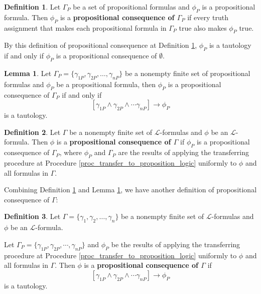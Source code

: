 \documentclass[11pt,letterpaper]{book}
\theoremstyle{definition}
\newtheorem{definition}{Definition}[section]
\newtheorem{lemma}{Lemma}[section]
\begin{document}
\begin{definition}\label{def:PC_proposition_formula}
Let $\Gamma_P$ be a set of propositional formulas and $\phi_P$ is a
propositional formula. Then $\phi_P$ is a \textbf{propositional
consequence of $\Gamma_P$} if every truth assignment that makes each
propositional formula in $\Gamma_P$ true also makes $\phi_P$ true.
\end{definition}


By this definition of propositional consequence at Definition
\ref{def:PC_proposition_formula}, $\phi_P$ is a tautology if and only if
$\phi_P$ is a propositional
consequence of $\emptyset$.


\begin{lemma}\label{lemma:PC_tautology}
Let $\Gamma_P = \{ \gamma_{1P}, \gamma_{2P}, \ldots, \gamma_{nP} \}$ be
a nonempty finite set of propositional formulas and $\phi_P$ be a
propositional formula, then $\phi_P$ is a propositional consequence of
$\Gamma_P$ if and only if
$$ [\gamma_{1P} \land \gamma_{2P} \land \cdots \gamma_{nP} ] \rightarrow
\phi_P  $$
is a tautology.
\end{lemma}

\begin{definition}\label{def:PC_formula}
Let $\Gamma$ be a nonempty finite set of $\mathcal{L}$-formulas and
$\phi$ be an $\mathcal{L}$-formula. Then $\phi$ is a\textbf{
propositional consequence of $\Gamma$} if $\phi_P$ is a propositional
consequence of $\Gamma_P$, where $\phi_P$ and $\Gamma_P$ are the results
of applying the transferring procedure at Procedure
\ref{proc_transfer_to_proposition_logic} uniformly to $\phi$ and all
formulas in $\Gamma$.
\end{definition}

Combining Definition \ref{def:PC_proposition_formula} and Lemma
\ref{lemma:PC_tautology}, we have another definition of propositional
consequence of $\Gamma$:
\begin{definition}\label{def:PC_formula_2}
Let $\Gamma = \{ \gamma_1, \gamma_2, \ldots, \gamma_n \}$ be a nonempty
finite set of $\mathcal{L}$-formulas and $\phi$ be an
$\mathcal{L}$-formula.

Let $ \Gamma_P = \{ \gamma_{1P} , \gamma_{2P} , \cdots, \gamma_{nP} \} $
and $ \phi_P $ be the results of applying the transferring procedure at
Procedure \ref{proc_transfer_to_proposition_logic} uniformly to $\phi$ and
all formulas in $\Gamma$. Then $\phi$ is a\textbf{ propositional
consequence of $\Gamma$} if
$$ [\gamma_{1P} \land \gamma_{2P} \land \cdots \gamma_{nP} ] \rightarrow
\phi_P  $$
is a tautology.
\end{definition}
\end{document}
